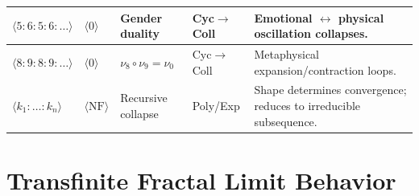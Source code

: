 \begin{longtable}{p{2.8cm}|p{1.8cm}|p{2.2cm}|p{1.5cm}|p{4cm}}
$\langle 5:6:5:6:\dots \rangle$
& $\langle 0 \rangle$
& Gender duality
& \textsf{Cyc$\to$Coll}
& Emotional $\leftrightarrow$ physical oscillation collapses.
\\
\midrule

$\langle 8:9:8:9:\dots \rangle$
& $\langle 0 \rangle$
& $\nu_8\circ\nu_9=\nu_0$
& \textsf{Cyc$\to$Coll}
& Metaphysical expansion/contraction loops.
\\
\midrule

$\langle k_1:\dots:k_n\rangle$
& $\langle\mathrm{NF}\rangle$
& Recursive collapse
& \textsf{Poly/Exp}
& Shape determines convergence; reduces to irreducible subsequence.
\\

\end{longtable}
\normalsize

\section{Transfinite Fractal Limit Behavior}

